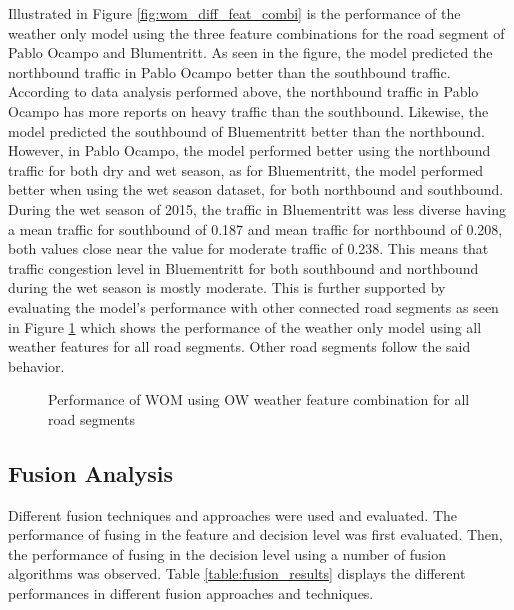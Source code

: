 Illustrated in Figure \ref{fig:wom_diff_feat_combi} is the performance of the weather only model using the three feature combinations for the road segment of Pablo Ocampo and Blumentritt. As seen in the figure, the model predicted the northbound traffic in Pablo Ocampo better than the southbound traffic. According to data analysis performed above, the northbound traffic in Pablo Ocampo has more reports on heavy traffic than the southbound. Likewise, the model predicted the southbound of Bluementritt better than the northbound. However, in Pablo Ocampo, the model performed better using the northbound traffic for both dry and wet season, as for Bluementritt, the model performed better when using the wet season dataset, for both northbound and southbound. During the wet season of 2015, the traffic in Bluementritt was less diverse having a mean traffic for southbound of 0.187 and mean traffic for northbound of 0.208, both values close near the value for moderate traffic of 0.238. This means that traffic congestion level in Bluementritt for both southbound and northbound during the wet season is mostly moderate. This is further supported by evaluating the model’s performance with other connected road segments as seen in Figure \ref{fig:wom_feat_combi_roads} which shows the performance of the weather only model using all weather features for all road segments. Other road segments follow the said behavior.

\begin{figure}
  \centering
  \captionsetup{justification=centering}
  \caption{Performance of WOM using OW weather feature combination for all road segments}
  \label{fig:wom_feat_combi_roads}
\end{figure}



\subsection{Fusion Analysis}
Different fusion techniques and approaches were used and evaluated. The performance of fusing in the feature and decision level was first evaluated. Then, the performance of fusing in the decision level using a number of fusion algorithms was observed. Table \ref{table:fusion_results} displays the different performances in different fusion approaches and techniques. 

